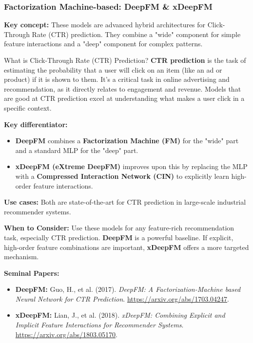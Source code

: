 \documentclass{article}
\begin{document}
    \subsubsection{Factorization Machine-based: DeepFM \& xDeepFM}
\noindent\textbf{Key concept:} These models are advanced hybrid architectures for Click-Through Rate (CTR) prediction. They combine a "wide" component for simple feature interactions and a "deep" component for complex patterns.
    
    \begin{asidebox}{What is Click-Through Rate (CTR) Prediction?}
\noindent\textbf{CTR prediction} is the task of estimating the probability that a user will click on an item (like an ad or product) if it is shown to them. It's a critical task in online advertising and recommendation, as it directly relates to engagement and revenue. Models that are good at CTR prediction excel at understanding what makes a user click in a specific context.
    \end{asidebox}

\noindent\textbf{Key differentiator:}
    \begin{itemize}
        \item \textbf{DeepFM} combines a \textbf{Factorization Machine (FM)} for the "wide" part and a standard MLP for the "deep" part.
        \item \textbf{xDeepFM (eXtreme DeepFM)} improves upon this by replacing the MLP with a \textbf{Compressed Interaction Network (CIN)} to explicitly learn high-order feature interactions.
    \end{itemize}

\noindent\textbf{Use cases:} Both are state-of-the-art for CTR prediction in large-scale industrial recommender systems.

\noindent\textbf{When to Consider:} Use these models for any feature-rich recommendation task, especially CTR prediction. \textbf{DeepFM} is a powerful baseline. If explicit, high-order feature combinations are important, \textbf{xDeepFM} offers a more targeted mechanism.

\noindent\textbf{Seminal Papers:}
    \begin{itemize}
        \item \textbf{DeepFM:} Guo, H., et al. (2017). \textit{DeepFM: A Factorization-Machine based Neural Network for CTR Prediction}. \url{https://arxiv.org/abs/1703.04247}.
        \item \textbf{xDeepFM:} Lian, J., et al. (2018). \textit{xDeepFM: Combining Explicit and Implicit Feature Interactions for Recommender Systems}. \url{https://arxiv.org/abs/1803.05170}.
    \end{itemize}
\end{document}
